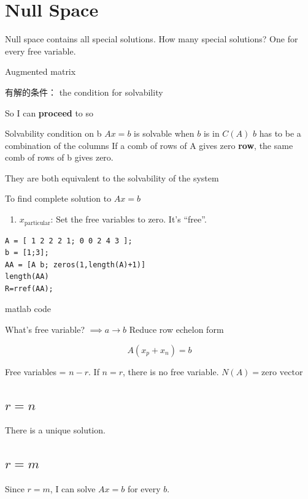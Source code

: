 
\section{ Null Space }%
Null space contains all special solutions. How many special solutions?
One for every free variable.


Augmented matrix


有解的条件： the condition for solvability

So I can \textbf{proceed} to so

Solvability condition on b
\( Ax = b \) is solvable when \( b \) is in \( C(A) \)
\( b \) has to be a combination of the columns
If a comb of rows of A gives zero \textbf{row}, the same comb of rows of b gives zero.

They are both equivalent to the solvability of the system

To find complete solution to \( Ax = b \)
\begin{enumerate}
	\item \( x_\text{particular} \): Set the free variables to zero. It's ``free''.
\end{enumerate}


\begin{listing}
	\begin{verbatim}
A = [ 1 2 2 2 1; 0 0 2 4 3 ];
b = [1;3];
AA = [A b; zeros(1,length(A)+1)]
length(AA)
R=rref(AA);
\end{verbatim}
	\caption{matlab code}
	\label{lst:matlab_code}
\end{listing}

What's free variable?
\( \implies a \to b \)
Reduce row echelon form

\begin{equation*}
	A (x_p + x_n) = b
\end{equation*}

Free variables = \( n -r \). If \( n = r \), there is no free variable.
\(  N(A) = { \text{zero vector} } \)

\subsection{\( r = n \)}%
There is a unique solution.

\subsection{\( r = m \)}%
Since \( r = m \), I can solve \( Ax = b \) for every \( b \).

